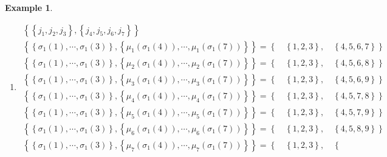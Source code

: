 \documentclass[aps,preprint]{revtex4}%
\newtheorem{example}[theorem]{Example}
\begin{document}
\begin{example}
\begin{enumerate}
\item
\begin{gather}
\left\{  \left\{  j_{1},j_{2},j_{3}\right\}  ,\left\{  j_{4},j_{5},j_{6}%
,j_{7}\right\}  \right\} \\
\left\{  \left\{  \sigma_{1}\left(  1\right)  ,\cdots,\sigma_{1}\left(
3\right)  \right\}  ,\left\{  \mu_{1}\left(  \sigma_{1}\left(  4\right)
\right)  ,\cdots,\mu_{1}\left(  \sigma_{1}\left(  7\right)  \right)  \right\}
\right\}  =\left\{  \quad\left\{  1,2,3\right\}  ,\quad\left\{
4,5,6,7\right\}  \right\} \\
\left\{  \left\{  \sigma_{1}\left(  1\right)  ,\cdots,\sigma_{1}\left(
3\right)  \right\}  ,\left\{  \mu_{2}\left(  \sigma_{1}\left(  4\right)
\right)  ,\cdots,\mu_{2}\left(  \sigma_{1}\left(  7\right)  \right)  \right\}
\right\}  =\left\{  \quad\left\{  1,2,3\right\}  ,\quad\left\{
4,5,6,8\right\}  \right\} \\
\left\{  \left\{  \sigma_{1}\left(  1\right)  ,\cdots,\sigma_{1}\left(
3\right)  \right\}  ,\left\{  \mu_{3}\left(  \sigma_{1}\left(  4\right)
\right)  ,\cdots,\mu_{3}\left(  \sigma_{1}\left(  7\right)  \right)  \right\}
\right\}  =\left\{  \quad\left\{  1,2,3\right\}  ,\quad\left\{
4,5,6,9\right\}  \right\} \\
\left\{  \left\{  \sigma_{1}\left(  1\right)  ,\cdots,\sigma_{1}\left(
3\right)  \right\}  ,\left\{  \mu_{4}\left(  \sigma_{1}\left(  4\right)
\right)  ,\cdots,\mu_{4}\left(  \sigma_{1}\left(  7\right)  \right)  \right\}
\right\}  =\left\{  \quad\left\{  1,2,3\right\}  ,\quad\left\{
4,5,7,8\right\}  \right\} \\
\left\{  \left\{  \sigma_{1}\left(  1\right)  ,\cdots,\sigma_{1}\left(
3\right)  \right\}  ,\left\{  \mu_{5}\left(  \sigma_{1}\left(  4\right)
\right)  ,\cdots,\mu_{5}\left(  \sigma_{1}\left(  7\right)  \right)  \right\}
\right\}  =\left\{  \quad\left\{  1,2,3\right\}  ,\quad\left\{
4,5,7,9\right\}  \right\} \\
\left\{  \left\{  \sigma_{1}\left(  1\right)  ,\cdots,\sigma_{1}\left(
3\right)  \right\}  ,\left\{  \mu_{6}\left(  \sigma_{1}\left(  4\right)
\right)  ,\cdots,\mu_{6}\left(  \sigma_{1}\left(  7\right)  \right)  \right\}
\right\}  =\left\{  \quad\left\{  1,2,3\right\}  ,\quad\left\{
4,5,8,9\right\}  \right\} \\
\left\{  \left\{  \sigma_{1}\left(  1\right)  ,\cdots,\sigma_{1}\left(
3\right)  \right\}  ,\left\{  \mu_{7}\left(  \sigma_{1}\left(  4\right)
\right)  ,\cdots,\mu_{7}\left(  \sigma_{1}\left(  7\right)  \right)  \right\}
\right\}  =\left\{  \quad\left\{  1,2,3\right\}  ,\quad\left\{

\end{gather}
\end{enumerate}
\end{example}
\end{document}
